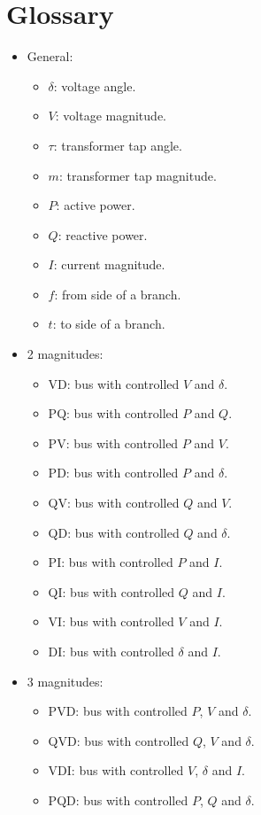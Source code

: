 \documentclass[11pt]{article}
\begin{document}
	\section{Glossary}
	\begin{itemize}
		\item General:
		\begin{itemize}
		\item $\delta$: voltage angle.
		\item $V$: voltage magnitude.
		\item $\tau$: transformer tap angle.
		\item $m$: transformer tap magnitude.
		\item $P$: active power.
		\item $Q$: reactive power.
		\item $I$: current magnitude.
		\item $f$: from side of a branch.
		\item $t$: to side of a branch.
		\end{itemize}
		\item 2 magnitudes:
		\begin{itemize}
			\item VD: bus with controlled $V$ and $\delta$.
			\item PQ: bus with controlled $P$ and $Q$.
			\item PV: bus with controlled $P$ and $V$.
			\item PD: bus with controlled $P$ and $\delta$.
			\item QV: bus with controlled $Q$ and $V$.
			\item QD: bus with controlled $Q$ and $\delta$.
			\item PI: bus with controlled $P$ and $I$.
			\item QI: bus with controlled $Q$ and $I$.
			\item VI: bus with controlled $V$ and $I$.
			\item DI: bus with controlled $\delta$ and $I$. 
		\end{itemize}
		\item 3 magnitudes:
		\begin{itemize}
			\item PVD: bus with controlled $P$, $V$ and $\delta$.
			\item QVD: bus with controlled $Q$, $V$ and $\delta$.
			\item VDI: bus with controlled $V$, $\delta$ and $I$.
			\item PQD: bus with controlled $P$, $Q$ and $\delta$.

\end{itemize}
\end{itemize}
\end{document}
